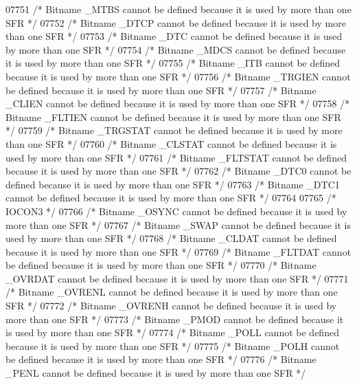 \begin{DoxyCode}
07751 \textcolor{comment}{/* Bitname \_MTBS cannot be defined because it is used by more than one SFR */}
07752 \textcolor{comment}{/* Bitname \_DTCP cannot be defined because it is used by more than one SFR */}
07753 \textcolor{comment}{/* Bitname \_DTC cannot be defined because it is used by more than one SFR */}
07754 \textcolor{comment}{/* Bitname \_MDCS cannot be defined because it is used by more than one SFR */}
07755 \textcolor{comment}{/* Bitname \_ITB cannot be defined because it is used by more than one SFR */}
07756 \textcolor{comment}{/* Bitname \_TRGIEN cannot be defined because it is used by more than one SFR */}
07757 \textcolor{comment}{/* Bitname \_CLIEN cannot be defined because it is used by more than one SFR */}
07758 \textcolor{comment}{/* Bitname \_FLTIEN cannot be defined because it is used by more than one SFR */}
07759 \textcolor{comment}{/* Bitname \_TRGSTAT cannot be defined because it is used by more than one SFR */}
07760 \textcolor{comment}{/* Bitname \_CLSTAT cannot be defined because it is used by more than one SFR */}
07761 \textcolor{comment}{/* Bitname \_FLTSTAT cannot be defined because it is used by more than one SFR */}
07762 \textcolor{comment}{/* Bitname \_DTC0 cannot be defined because it is used by more than one SFR */}
07763 \textcolor{comment}{/* Bitname \_DTC1 cannot be defined because it is used by more than one SFR */}
07764 
07765 \textcolor{comment}{/* IOCON3 */}
07766 \textcolor{comment}{/* Bitname \_OSYNC cannot be defined because it is used by more than one SFR */}
07767 \textcolor{comment}{/* Bitname \_SWAP cannot be defined because it is used by more than one SFR */}
07768 \textcolor{comment}{/* Bitname \_CLDAT cannot be defined because it is used by more than one SFR */}
07769 \textcolor{comment}{/* Bitname \_FLTDAT cannot be defined because it is used by more than one SFR */}
07770 \textcolor{comment}{/* Bitname \_OVRDAT cannot be defined because it is used by more than one SFR */}
07771 \textcolor{comment}{/* Bitname \_OVRENL cannot be defined because it is used by more than one SFR */}
07772 \textcolor{comment}{/* Bitname \_OVRENH cannot be defined because it is used by more than one SFR */}
07773 \textcolor{comment}{/* Bitname \_PMOD cannot be defined because it is used by more than one SFR */}
07774 \textcolor{comment}{/* Bitname \_POLL cannot be defined because it is used by more than one SFR */}
07775 \textcolor{comment}{/* Bitname \_POLH cannot be defined because it is used by more than one SFR */}
07776 \textcolor{comment}{/* Bitname \_PENL cannot be defined because it is used by more than one SFR */}

\end{DoxyCode}

